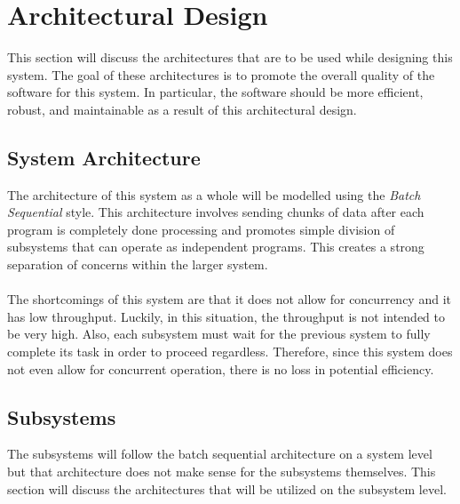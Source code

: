\documentclass[titlepage]{article}
\begin{document}
\section{Architectural Design}
This section will discuss the architectures that are to be used while designing this system. The goal of these architectures is to promote the overall quality of the software for this system. In particular, the software should be more efficient, robust, and maintainable as a result of this architectural design.
\subsection{System Architecture}
The architecture of this system as a whole will be modelled using the \textit{Batch Sequential} style. This architecture involves sending chunks of data after each program is completely done processing and promotes simple division of subsystems that can operate as independent programs. This creates a strong separation of concerns within the larger system.\\~\\
The shortcomings of this system are that it does not allow for concurrency and it has low throughput. Luckily, in this situation, the throughput is not intended to be very high. Also, each subsystem must wait for the previous system to fully complete its task in order to proceed regardless. Therefore, since this system does not even allow for concurrent operation, there is no loss in potential efficiency.
\newpage
\subsection{Subsystems}
The subsystems will follow the batch sequential architecture on a system level but that architecture does not make sense for the subsystems themselves. This section will discuss the architectures that will be utilized on the subsystem level.
\end{document}
